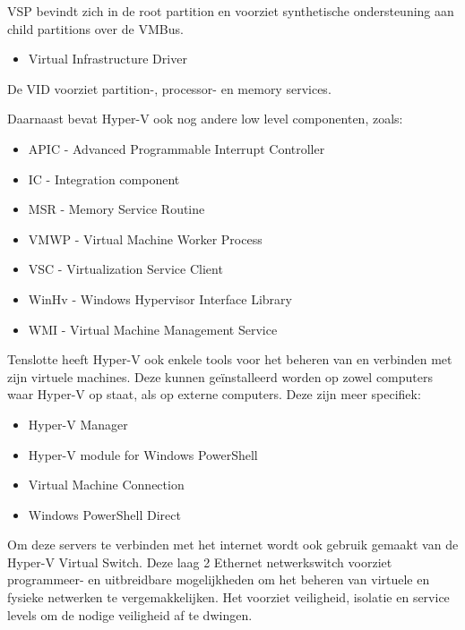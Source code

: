 VSP bevindt zich in de root partition en voorziet synthetische ondersteuning aan child partitions over de VMBus.

\begin{itemize}[noitemsep]
	\item Virtual Infrastructure Driver
\end{itemize}

De VID voorziet partition-, processor- en memory services.

Daarnaast bevat Hyper-V ook nog andere low level componenten, zoals:

\begin{itemize}[noitemsep]
	\item APIC - Advanced Programmable Interrupt Controller
	\item IC - Integration component
	\item MSR - Memory Service Routine
	\item VMWP - Virtual Machine Worker Process 
	\item VSC - Virtualization Service Client
	\item WinHv  - Windows Hypervisor Interface Library 
	\item WMI - Virtual Machine Management Service 
\end{itemize}

Tenslotte heeft Hyper-V ook enkele tools voor het beheren van en verbinden met zijn virtuele machines. Deze kunnen geïnstalleerd worden op zowel computers waar Hyper-V op staat, als op externe computers. Deze zijn meer specifiek:

\begin{itemize}[noitemsep]
	\item Hyper-V Manager
	\item Hyper-V module for Windows PowerShell
	\item Virtual Machine Connection
	\item Windows PowerShell Direct
\end{itemize}

Om deze servers te verbinden met het internet wordt ook gebruik gemaakt van de Hyper-V Virtual Switch. Deze laag 2 Ethernet netwerkswitch voorziet programmeer- en uitbreidbare mogelijkheden om het beheren van virtuele en fysieke netwerken te vergemakkelijken. Het voorziet veiligheid, isolatie en service levels om de nodige veiligheid af te dwingen.

